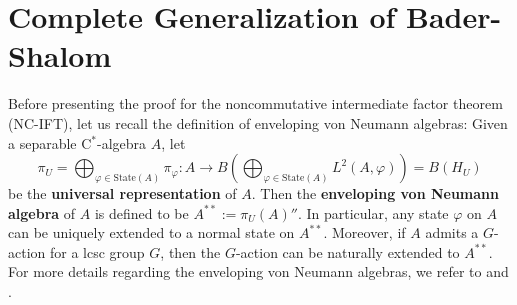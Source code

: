 \documentclass[12pt]{amsart}
\theoremstyle{definition}
\begin{document}
\section{Complete Generalization of Bader-Shalom}
\label{sec:genNCIFT}
Before presenting the proof for the noncommutative intermediate factor theorem (NC-IFT), let us recall the definition of enveloping von Neumann algebras: Given a separable C$^*$-algebra $A$, let 
$$\pi_U=\bigoplus_{\varphi\in\mathrm{State}(A)}\pi_\varphi: A\to B\left(\bigoplus_{\varphi\in\mathrm{State}(A)} L^2(A,\varphi)\right)=B(H_U)$$
be the \textbf{universal representation} of $A$. Then the \textbf{enveloping von Neumann algebra} of $A$ is defined to be $A^{**}:=\pi_U(A)''$. In particular, any state $\varphi$ on $A$ can be uniquely extended to a normal state on $A^{**}$. Moreover, if $A$ admits a $G$-action for a lcsc group $G$, then the $G$-action can be naturally extended to $A^{**}$. For more details regarding the enveloping von Neumann algebras, we refer to \cite[Subsection 1.4]{BObook} and \cite[Section III.2]{takesaki}.
\end{document}
